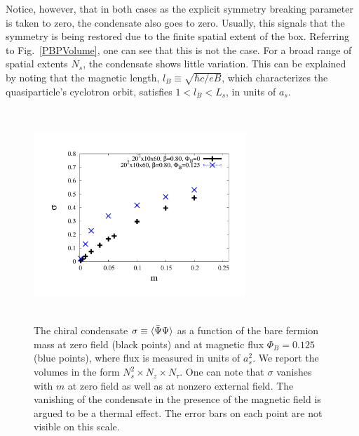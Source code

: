 \documentclass[aps,prd,twocolumn,showpacs,superscriptaddress,groupedaddress]{revtex4}  %
\begin{document}
Notice, however, that in both cases as the explicit symmetry breaking parameter is taken to zero, the condensate also goes to zero. Usually, this signals that the symmetry is being restored due to the finite spatial extent of the box. Referring to Fig.~\ref{PBPVolume}, one can see that this is not the
case. For a broad range of spatial extents $N_s$, the condensate shows little variation. This can be explained by noting that the magnetic length, $l_B \equiv \sqrt{\hbar c/eB}$, which characterizes the quasiparticle's cyclotron orbit, satisfies $1 < l_B < L_s$, in units of $a_s$. 

\begin{figure}
\includegraphics[height=8cm,width=8cm]{pbp_vs_m_compare_graphene_paper.pdf} \hspace{-1cm}
\caption{The chiral condensate $\sigma \equiv {\langle {\bar \Psi}\Psi \rangle}$ as a function of the bare fermion mass at zero field (black points) and at magnetic flux $\Phi_B=0.125$ (blue points), where flux is measured in units of $a^2_s$. We report the volumes in the form $N^2_s \times N_z \times N_{\tau}$.  One can note that $\sigma$ vanishes with $m$ at zero field as well as at nonzero external field. The vanishing of the condensate in the presence of the magnetic field is argued to be a thermal effect. The error bars on each point are not visible on this scale.}
\label{PBPComparison}
\end{figure}
\end{document}

